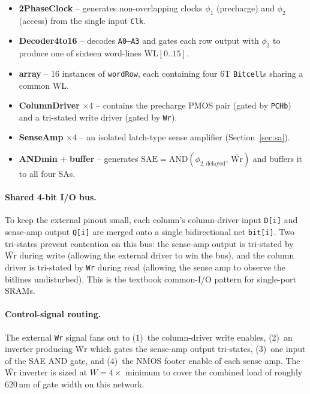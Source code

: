 \documentclass[11pt,letterpaper]{article}
\newcommand{\nWr}{\ensuremath{\overline{\text{Wr}}}}
\begin{document}
\begin{itemize}
  \item \textbf{2PhaseClock} -- generates non-overlapping clocks
        $\phi_1$ (precharge) and $\phi_2$ (access) from the single input
        \texttt{Clk}.
  \item \textbf{Decoder4to16} -- decodes \texttt{A0--A3} and gates each row
        output with $\phi_2$ to produce one of sixteen word-lines
        $\mathrm{WL}[0..15]$.
  \item \textbf{array} -- 16 instances of \texttt{wordRow}, each containing
        four 6T \texttt{Bitcell}s sharing a common WL.
  \item \textbf{ColumnDriver} $\times 4$ -- contains the precharge PMOS pair
        (gated by \texttt{PCHb}) and a tri-stated write driver (gated by
        \texttt{Wr}).
  \item \textbf{SenseAmp} $\times 4$ -- an isolated latch-type sense amplifier
        (Section~\ref{sec:sa}).
  \item \textbf{ANDmin} + \textbf{buffer} -- generates
        $\mathrm{SAE}=\mathrm{AND}(\phi_{2,\mathrm{delayed}},\,\nWr)$ and
        buffers it to all four SAs.
\end{itemize}

\paragraph{Shared 4-bit I/O bus.}
To keep the external pinout small, each column's column-driver input
\texttt{D[i]} and sense-amp output \texttt{Q[i]} are merged onto a single
bidirectional net \texttt{bit[i]}. Two tri-states prevent contention on this
bus: the sense-amp output is tri-stated by $\nWr$ during write (allowing the
external driver to win the bus), and the column driver is tri-stated by
\texttt{Wr} during read (allowing the sense amp to observe the bitlines
undisturbed). This is the textbook common-I/O pattern for single-port SRAMs.

\paragraph{Control-signal routing.}
The external \texttt{Wr} signal fans out to (1)~the column-driver write
enables, (2)~an inverter producing $\nWr$ which gates the sense-amp output
tri-states, (3)~one input of the SAE AND gate, and (4)~the NMOS footer enable
of each sense amp. The $\nWr$ inverter is sized at $W=4\times$ minimum to
cover the combined load of roughly 620\,nm of gate width on this network.
\end{document}
